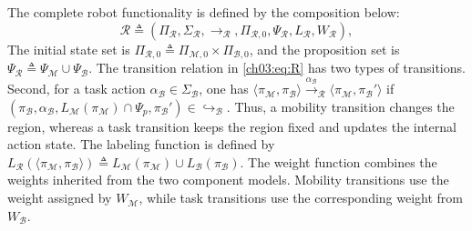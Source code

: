 \begin{definition}
The complete robot functionality is defined by the composition below:
\begin{equation}
\label{ch03:eq:R}
\mathcal{R} \triangleq
(\Pi_{\mathcal{R}}, \Sigma_{\mathcal{R}}, \longrightarrow_{\mathcal{R}},
 \Pi_{\mathcal{R},0}, \Psi_{\mathcal{R}}, L_{\mathcal{R}},
 W_{\mathcal{R}}),
\end{equation}
The initial state set is
$\Pi_{\mathcal{R},0} \triangleq
\Pi_{\mathcal{M},0} \times \Pi_{\mathcal{B},0}$, and the proposition set is
$\Psi_{\mathcal{R}} \triangleq
\Psi_{\mathcal{M}} \cup \Psi_{\mathcal{B}}$.
The transition relation in \eqref{ch03:eq:R} has two types of transitions.
 Second, for a task action
$\alpha_{\mathcal{B}} \in \Sigma_{\mathcal{B}}$, one has
$\langle \pi_{\mathcal{M}}, \pi_{\mathcal{B}} \rangle
\xrightarrow{\alpha_{\mathcal{B}}}_{\mathcal{R}}
\langle \pi_{\mathcal{M}}, \pi_{\mathcal{B}}' \rangle$
if
$(\pi_{\mathcal{B}}, \alpha_{\mathcal{B}},
  L_{\mathcal{M}}(\pi_{\mathcal{M}}) \cap \Psi_p,
  \pi_{\mathcal{B}}') \in \hookrightarrow_{\mathcal{B}}$.
Thus, a mobility transition changes the region, whereas a task transition keeps
the region fixed and updates the internal action state.
The labeling function is defined by
$L_{\mathcal{R}}(\langle \pi_{\mathcal{M}}, \pi_{\mathcal{B}} \rangle)
\triangleq
L_{\mathcal{M}}(\pi_{\mathcal{M}}) \cup L_{\mathcal{B}}(\pi_{\mathcal{B}})$.
The weight function combines the weights inherited from the two component
models. Mobility transitions use the weight assigned by $W_{\mathcal{M}}$,
while task transitions use the corresponding weight from $W_{\mathcal{B}}$.
\end{definition}


